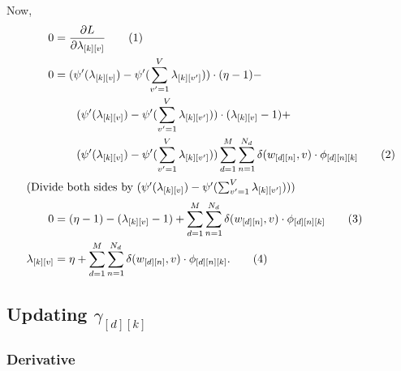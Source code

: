 \documentclass[12pt]{article}
\newcommand\numberthis{\addtocounter{equation}{1}\tag{\theequation}}
\begin{document}
Now,
\begin{align*}
    0 &= \frac{\partial L}{\partial \lambda_{[k][v]}}
    \numberthis\\
    0 &=
    (\psi'(\lambda_{[k][v]}) - \psi'(\sum_{v'=1}^{V}
    \lambda_{[k][v']})) \cdot (\eta - 1) -
    \\* &\quad\quad (\psi'(\lambda_{[k][v]}) -
    \psi'(\sum_{v'=1}^{V} \lambda_{[k][v']})) \cdot (\lambda_{[k][v]} - 1) +
    \\* & \quad\quad (\psi'(\lambda_{[k][v]}) -
    \psi'(\sum_{v'=1}^{V}\lambda_{[k][v']})) \sum_{d=1}^{M} \sum_{n=1}^{N_{d}}
    \delta(w_{[d][n]},v) \cdot \phi_{[d][n][k]}
    \numberthis\\
    \intertext{(Divide both sides by $(\psi'(\lambda_{[k][v]}) -
    \psi'(\sum_{v'=1}^{V} \lambda_{[k][v']}))$)}
    0 &= (\eta - 1) - (\lambda_{[k][v]} - 1) + \sum_{d=1}^{M} \sum_{n=1}^{N_{d}}
    \delta(w_{[d][n]}, v)\cdot\phi_{[d][n][k]}
    \numberthis\\
    \lambda_{[k][v]} &= \eta + \sum_{d=1}^{M} \sum_{n=1}^{N_{d}}
    \delta(w_{[d][n]}, v)\cdot\phi_{[d][n][k]}.
    \numberthis
\end{align*}

\subsection{Updating $\gamma_{[d][k]}$}

\subsubsection{Derivative}
\end{document}
